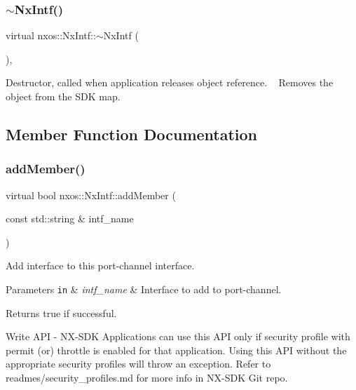 \subsubsection{\texorpdfstring{$\sim$\+Nx\+Intf()}{~NxIntf()}}
{\footnotesize\ttfamily virtual nxos\+::\+Nx\+Intf\+::$\sim$\+Nx\+Intf (\begin{DoxyParamCaption}{ }\end{DoxyParamCaption})\hspace{0.3cm}{\ttfamily [inline]}, {\ttfamily [virtual]}}

Destructor, called when application releases object reference. ~\newline
Removes the object from the S\+DK map. 

\subsection{Member Function Documentation}
\mbox{\label{classnxos_1_1_nx_intf_a499756ef5447cd4037d095a444aefc99}} 
\subsubsection{\texorpdfstring{add\+Member()}{addMember()}}
{\footnotesize\ttfamily virtual bool nxos\+::\+Nx\+Intf\+::add\+Member (\begin{DoxyParamCaption}\item[{const std\+::string \&}]{intf\+\_\+name }\end{DoxyParamCaption})\hspace{0.3cm}{\ttfamily [pure virtual]}}

Add interface to this port-\/channel interface. 
\begin{DoxyParams}[1]{Parameters}
\mbox{\tt in}  & {\em intf\+\_\+name} & Interface to add to port-\/channel. \\
\hline
\end{DoxyParams}
\begin{DoxyReturn}{Returns}
true if successful. ~\newline

\end{DoxyReturn}
\begin{DoxyVerb}Write API - NX-SDK Applications can use this API only if security profile with permit (or) throttle is 
            enabled for that application. Using this API without the appropriate security profiles will
            throw an exception. Refer to readmes/security_profiles.md for more info in NX-SDK Git repo.
\end{DoxyVerb}



